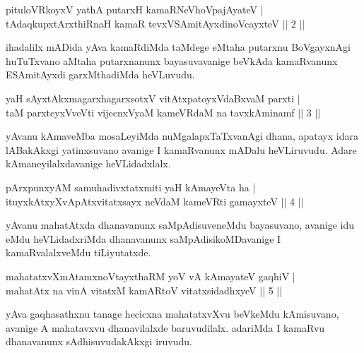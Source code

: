 
\begin{shl}
pituloVRkoyxV yathA putarxH kamaRNeVhoVpajAyateV | \\
tAdaqkupxtArxthiRnaH kamaR tevxVSAmitAyxdinoVcayxteV \hfill|| 2 || 
\end{shl}

\begin{artha}
ihadalilx mADida yAva kamaRdiMda taMdege eMtaha putarxnu BoVgayxnAgi huTuTxvano aMtaha putarxnanunx bayasuvavanige beVkAda kamaRvanunx ESAmitAyxdi garxMthadiMda heVLuvudu.
\end{artha}


\begin{shl}
yaH sAyxtAkxmagarxhagarxsotxV vitAtxpatoyxVdaBxvaM parxti | \\
taM parxteyxVveVti vijecnxVyaM kameVRdaM na tavxkAminamf \hfill|| 3 || 
\end{shl}

\begin{artha}
yAvanu kAmaveMba mosaLeyiMda nuMgalapxTaTxvanAgi dhana, apatayx idara lABakAkxgi yatinxsuvano avanige I kamaRvanunx mADalu heVLiruvudu. Adare kAmaneyilalxdavanige heVLidadxlalx.
\end{artha}


\begin{shl}
pArxpunxyAM samuhadivxtatxmiti yaH kAmayeVta ha | \\
ituyxkAtxyX\s vApAtxvitatxsayx neVdaM kameVRti gamayxteV \hfill|| 4 || 
\end{shl}

\begin{artha}
yAvanu mahatAtxda dhanavanunx saMpAdisuveneMdu bayasuvano, avanige idu eMdu heVLidadxriMda dhanavanunx saMpAdisikoMDavanige I kamaRvalalxveMdu tiLiyutatxde.
\end{artha}


\begin{shl}
mahatatxvXmAtamxnoV\s tayxthaRM yoV vA kAmayateV gaqhiV | \\
mahatAtx na vinA vitatxM kamARtoV vitatxsidadhxyeV \hfill|| 5 || 
\end{shl}

\begin{artha}
yAva gaqhasathxnu tanage hecicxna mahatatxvXvu beVkeMdu kAmisuvano, avanige A mahatavxvu dhanavilalxde baruvudilalx. adariMda I kamaRvu dhanavanunx sAdhisuvudakAkxgi iruvudu.
\end{artha}

